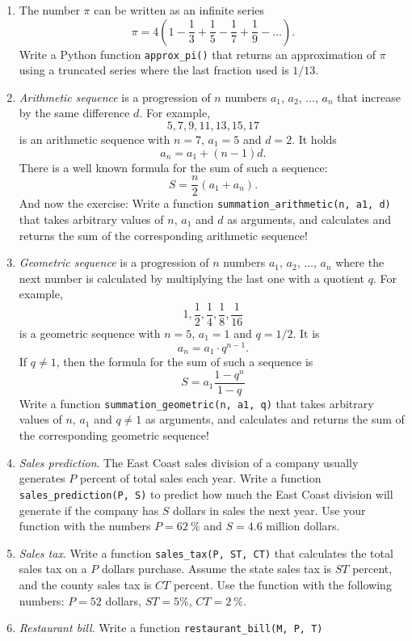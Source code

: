 \begin{enumerate}
\item The number $\pi$ can be written as an infinite series 
$$
\pi = 4\left(1 - \frac{1}{3} + \frac{1}{5} - \frac{1}{7} + \frac{1}{9} - \ldots     \right).
$$
Write a Python function {\tt approx\_pi()} that returns an approximation of $\pi$ using a truncated 
series where the last fraction used is $1/13$.
\item {\em Arithmetic sequence} is a progression of $n$ numbers $a_1$, $a_2$, $\ldots$, $a_n$
that increase by the same difference $d$. For example, 
$$
5, 7, 9, 11, 13, 15, 17
$$
is an arithmetic sequence with $n = 7$, $a_1 = 5$ and $d = 2$. It holds
$$
a_n = a_1 + (n-1)d.
$$
There is a well known formula for the sum of such a sequence:
$$
S = \frac{n}{2}(a_1 + a_n).
$$
And now the exercise: Write a function {\tt summation\_arithmetic(n, a1, d)} that takes arbitrary 
values of $n$, $a_1$ and $d$ as arguments, and calculates and returns the sum
of the corresponding arithmetic sequence! 
\item {\em Geometric sequence} is a progression of $n$ numbers $a_1$, $a_2$, $\ldots$, $a_n$
where the next number is calculated by multiplying the last one with a quotient $q$.
For example, 
$$
1, \frac{1}{2}, \frac{1}{4}, \frac{1}{8}, \frac{1}{16}
$$
is a geometric sequence with $n = 5$, $a_1 = 1$ and $q = 1/2$. It is 
$$
a_n = a_1 \cdot q^{n-1}.
$$
If $q \not = 1$, then the formula for the sum of such a sequence is
$$
S = a_1\frac{1 - q^n}{1 - q}
$$
Write a function {\tt summation\_geometric(n, a1, q)} that takes arbitrary 
values of $n$, $a_1$ and $q \not = 1$ as arguments, and calculates 
and returns the sum of the corresponding geometric sequence! 
\item {\em Sales prediction}. The East Coast sales division of a company usually generates $P$
percent of total sales each year. Write a function {\tt sales\_prediction(P, S)} to predict how much 
the East Coast division will generate if the company has $S$ dollars in sales the next year. 
Use your function with the numbers $P = 62\ \%$ and $S = 4.6$ million dollars. 
\item {\em Sales tax}. 
Write a function {\tt sales\_tax(P, ST, CT)} that calculates the total sales tax on a $P$ dollars purchase. 
Assume the state sales tax is $ST$ percent, and the county sales tax is $CT$ percent. Use the
function with the following numbers: $P = 52$ dollars, $ST = 5 \%$, $CT = 2 \ \%$.
\item {\em Restaurant bill}. Write a function {\tt restaurant\_bill(M, P, T)} 

\end{enumerate}
